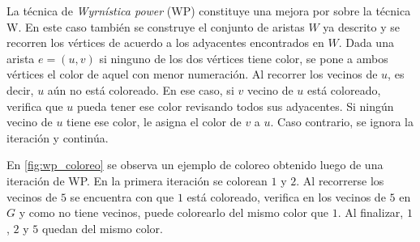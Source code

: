 La técnica de \textit{Wyrnística power} (WP) constituye una mejora por sobre la técnica W. En este caso también se construye el conjunto de aristas $W$ ya descrito y se recorren los vértices de acuerdo a los adyacentes encontrados en $W$. Dada una arista $e=(u,v)$ si ninguno de los dos vértices tiene color, se pone a ambos vértices el color de aquel con menor numeración. Al recorrer los vecinos de $u$, es decir, $u$ aún no está coloreado. En ese caso, si $v$ vecino de $u$ está coloreado, verifica que $u$ pueda tener ese color revisando todos sus adyacentes. Si ningún vecino de $u$ tiene ese color, le asigna el color de $v$ a $u$. Caso contrario, se ignora la iteración y continúa.

En \cref{fig:wp_coloreo} se observa un ejemplo de coloreo obtenido luego de una iteración de WP. En la primera iteración se colorean $1$ y $2$. Al recorrerse los vecinos de $5$ se encuentra con que $1$ está coloreado, verifica en los vecinos de $5$ en $G$ y como no tiene vecinos, puede colorearlo del mismo color que $1$. Al finalizar, $1$, $2$ y $5$ quedan del mismo color.

